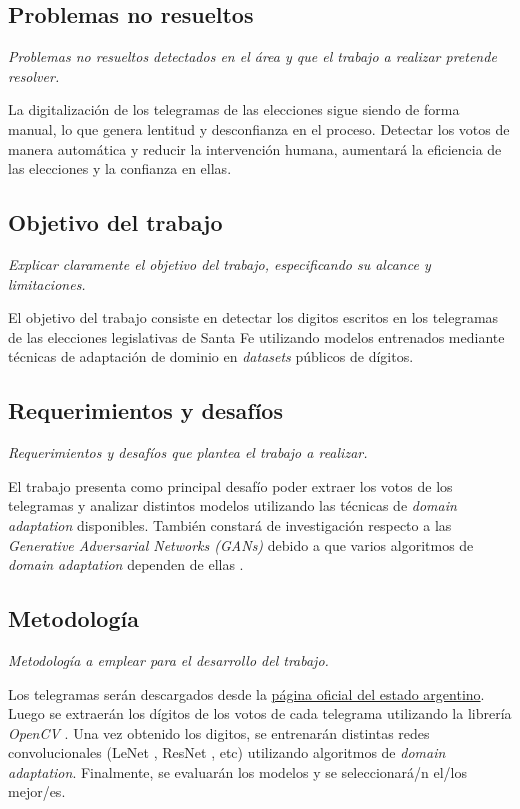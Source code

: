 \documentclass[a4paper, twoside]{report}
\begin{document}
\subsection*{Problemas no resueltos}
{\it Problemas no resueltos detectados en el área y que el trabajo a realizar
	pretende resolver.}

La digitalizaci\'on de los telegramas de las elecciones sigue siendo de forma
manual, lo que genera lentitud y desconfianza en el proceso. Detectar los votos
de manera autom\'atica y reducir la intervenci\'on humana, aumentar\'a la
eficiencia de las elecciones y la confianza en ellas.

\subsection*{Objetivo del trabajo}
{\it Explicar claramente el objetivo del trabajo, especificando su alcance y limitaciones.}

El objetivo del trabajo consiste en detectar los digitos escritos en los
telegramas de las elecciones legislativas de Santa Fe utilizando modelos
entrenados mediante t\'ecnicas de adaptaci\'on de dominio en {\it datasets}
p\'ublicos de d\'igitos.

\subsection*{Requerimientos y desafíos}
{\it Requerimientos y desafíos que plantea el trabajo a realizar.}

El trabajo presenta como principal desaf\'io poder extraer los votos de los
telegramas y analizar distintos modelos utilizando las t\'ecnicas de {\it
		domain adaptation} disponibles. Tambi\'en constar\'a de investigaci\'on
respecto a las {\it Generative Adversarial Networks (GANs)} debido a que varios
algoritmos de {\it domain adaptation} dependen de ellas
\cite{Tzeng_2017,xu2018unsupervised,ganin2016domain}.

\subsection*{Metodología}
{\it Metodología a emplear para el desarrollo del trabajo.}

Los telegramas ser\'an descargados desde la
\href{https://op.elecciones.gob.ar/telegramas/generales2021/}{p\'agina oficial
	del estado argentino}. Luego se extraer\'an los d\'igitos de los votos de cada
telegrama utilizando la librer\'ia {\it OpenCV} \cite{opencv_library}. Una vez
obtenido los digitos, se entrenar\'an distintas redes convolucionales (LeNet
\cite{lecun1998gradient}, ResNet \cite{he2016deep}, etc) utilizando algoritmos
de {\it domain adaptation}. Finalmente, se evaluar\'an los modelos y se
seleccionar\'a/n el/los mejor/es.
\end{document}
